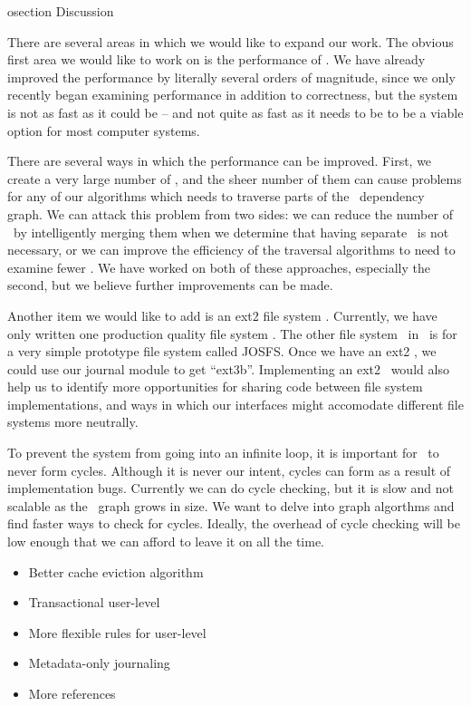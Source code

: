osection {Discussion}
\label{sec:discussion}

There are several areas in which we would like to expand our work. The obvious
first area we would like to work on is the performance of \Kudos. We have
already improved the performance by literally several orders of magnitude, since
we only recently began examining performance in addition to correctness, but the
system is not as fast as it could be -- and not quite as fast as it needs to be
to be a viable option for most computer systems.

There are several ways in which the performance can be improved. First, we
create a very large number of \chdescs, and the sheer number of them can cause
problems for any of our algorithms which needs to traverse parts of the \chdesc\
dependency graph. We can attack this problem from two sides: we can reduce the
number of \chdescs\ by intelligently merging them when we determine that having
separate \chdescs\ is not necessary, or we can improve the efficiency of the
traversal algorithms to need to examine fewer \chdescs. We have worked on both
of these approaches, especially the second, but we believe further improvements
can be made.

Another item we would like to add is an ext2 file system \module. Currently,
we have only written one production quality file system \module. The other
file system \module\ in \Kudos\ is for a very simple prototype file system
called JOSFS. Once we have an ext2 \module, we could use our journal module to
get ``ext3b''. Implementing an ext2 \module\ would also help us to identify
more opportunities for sharing code between file system implementations, and
ways in which our interfaces might accomodate different file systems more
neutrally.

To prevent the system from going into an infinite loop, it is important for
\chdescs\ to never form cycles. Although it is never our intent, cycles can
form as a result of implementation bugs. Currently we can do cycle checking,
but it is slow and not scalable as the \chdesc\ graph grows in size. We want to
delve into graph algorthms and find faster ways to check for cycles. Ideally,
the overhead of cycle checking will be low enough that we can afford to leave
it on all the time.

\begin{itemize}
\item Better cache eviction algorithm
\item Transactional user-level \chdescs
\item More flexible rules for user-level \chdescs
\item Metadata-only journaling
\item More references
\end{itemize}
